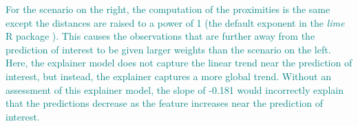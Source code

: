 \documentclass[AMS,STIX2COL]{WileyNJD-v2}\usepackage[]{graphicx}\usepackage[]{color}
\newcommand{\kge}[1]{\textcolor{teal}{#1}}
\renewcommand{\sout}[1]{\unskip}
\begin{document}
\kge{For the scenario on the right, the computation of the proximities is the same except the distances are raised to a power of 1 (the default exponent in the \emph{lime} R package \citep{pedersen:2020}). This causes the observations that are further away from the prediction of interest to be given larger weights than the scenario on the left. Here, the explainer model does not capture the linear trend near the prediction of interest, but instead, the explainer captures a more global trend. Without an assessment of this explainer model, the slope of -0.181 would incorrectly explain that the predictions decrease as the feature increases near the prediction of interest.} %


\end{document}
